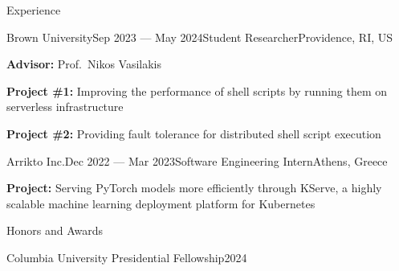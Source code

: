 \documentclass[letterpaper, 12pt]{resume}
\newcommand{\noitemvspace}{\vspace{-4ex}}
\newcommand{\heading}[1]{\textbf{#1:}\xspace}
\begin{document}
\begin{rSection}{Experience}
    \begin{rSubsection}{Brown University}{Sep 2023 --- May 2024}{Student Researcher}{Providence, RI, US}
        \item \heading{Advisor} Prof.\ Nikos Vasilakis
        \item \heading{Project \#1} Improving the performance of shell scripts by running them on serverless infrastructure
        \item \heading{Project \#2} Providing fault tolerance for distributed shell script execution
    \end{rSubsection}


    \begin{rSubsection}{Arrikto Inc.}{Dec 2022 --- Mar 2023}{Software Engineering Intern}{Athens, Greece}
        \item \heading{Project} Serving PyTorch models  more efficiently through KServe, a highly scalable machine learning deployment platform for Kubernetes
    \end{rSubsection}

\end{rSection}

\begin{rSection}{Honors and Awards}
    \begin{rSubsection}{Columbia University Presidential Fellowship}{2024}{}{}
        \item[] \noitemvspace
    \end{rSubsection}
\end{rSection}
\end{document}
